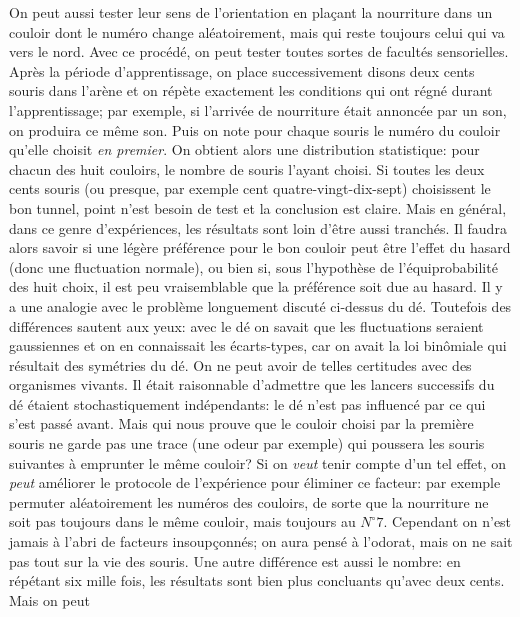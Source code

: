 On peut aussi tester leur sens de l'orientation en pla\c{c}ant la nourriture
dans un couloir dont le num\'ero change al\'eatoirement, mais qui reste
toujours celui qui va vers le nord. Avec ce proc\'ed\'e, on peut 
tester toutes sortes de facult\'es sensorielles.
\medskip
Apr\`es la p\'eriode d'apprentissage, on place successivement disons 
deux cents souris dans l'ar\`ene et on r\'ep\`ete exactement les 
conditions qui ont r\'egn\'e durant l'apprentissage; par exemple, si
l'arriv\'ee de nourriture \'etait annonc\'ee par un son, on produira ce
m\^eme son. Puis on note pour chaque souris le num\'ero du couloir qu'elle
choisit {\it en premier}. On obtient alors une distribution statistique: 
pour chacun des huit couloirs, le nombre de souris l'ayant choisi. 
\medskip
Si toutes les deux cents souris (ou presque, par exemple cent 
quatre-vingt-dix-sept) choisissent le bon tunnel, point n'est besoin de
test et la conclusion est claire. Mais en g\'en\'eral, dans ce genre
d'exp\'eriences, les r\'esultats sont loin d'\^etre aussi tranch\'es. Il 
faudra alors savoir si une l\'eg\`ere pr\'ef\'erence pour le bon couloir 
peut \^etre l'effet du hasard (donc une fluctuation normale), ou bien si,
sous l'hypoth\`ese de l'\'equiprobabilit\'e des huit choix, il est peu
vraisemblable que la pr\'ef\'erence soit due au hasard.
\medskip
Il y a une analogie avec le probl\`eme longuement discut\'e ci-dessus du 
d\'e. Toutefois des diff\'erences sautent aux yeux: avec le d\'e on savait
que les fluctuations seraient gaussiennes et on en connaissait les
\'ecarts-types, car on avait la loi bin\^omiale qui r\'esultait des
sym\'etries du d\'e.  On ne peut avoir de telles certitudes avec des
organismes vivants. Il \'etait raisonnable d'admettre que les lancers
successifs du d\'e \'etaient stochastiquement ind\'ependants: le d\'e 
n'est pas influenc\'e par ce qui s'est pass\'e avant. Mais qui nous prouve
que le couloir choisi par la premi\`ere souris ne garde pas une trace (une
odeur par exemple) qui poussera les souris suivantes \`a emprunter le
m\^eme couloir? Si on {\it veut} tenir compte d'un tel effet, on {\it peut}
am\'eliorer le protocole de l'exp\'erience pour \'eliminer ce facteur: par
exemple permuter al\'eatoirement les num\'eros des couloirs, de sorte
que la nourriture ne soit pas toujours dans le m\^eme couloir, mais
toujours au $N^\circ 7$. Cependant on n'est jamais \`a l'abri de facteurs
insoup\c{c}onn\'es; on aura pens\'e \`a l'odorat, mais on ne sait pas tout
sur la vie des souris.
\medskip
Une autre diff\'erence est aussi le nombre: en r\'ep\'etant six mille fois,
les r\'esultats sont bien plus concluants qu'avec deux cents. Mais on peut
